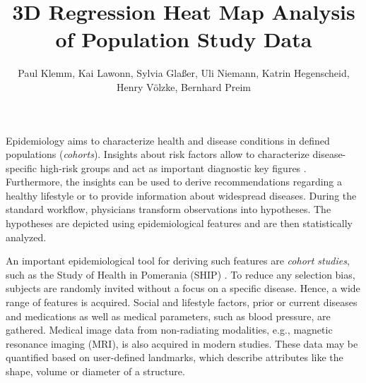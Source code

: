 \documentclass[journal]{style/vgtc} 			          %
\title{3D Regression Heat Map Analysis of Population Study Data}
\author{Paul Klemm, Kai Lawonn, Sylvia Gla{\ss}er, Uli Niemann, Katrin Hegenscheid, Henry V{\"o}lzke, Bernhard Preim}
\begin{document}


\maketitle
Epidemiology aims to characterize health and disease conditions in defined populations (\emph{cohorts}).
Insights about risk factors allow to characterize disease-specific high-risk groups and act as important diagnostic key figures \cite{Fletcher2012}.
Furthermore, the insights can be used to derive recommendations regarding a healthy lifestyle or to provide information about widespread diseases.
During the standard workflow, physicians transform observations into hypotheses.
The hypotheses are depicted using epidemiological features and are then statistically analyzed.

An important epidemiological tool for deriving such features are \emph{cohort studies}, such as the Study of Health in Pomerania (SHIP) \cite{Volzke2011}.
To reduce any selection bias, subjects are randomly invited without a focus on a specific disease.
Hence, a wide range of features is acquired.
%
Social and lifestyle factors, prior or current diseases and medications as well as medical parameters, such as blood pressure, are gathered.
Medical image data from non-radiating modalities, e.g., magnetic resonance imaging (MRI), is also acquired in modern studies.
These data may be quantified based on user-defined landmarks, which describe attributes like the shape, volume or diameter of a structure.
\end{document}
